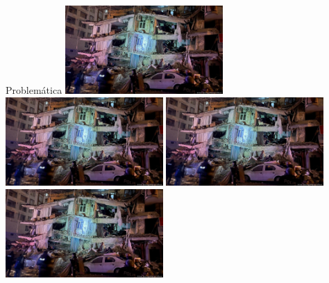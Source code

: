\documentclass[
	12pt, %
	aspectratio=169, %
]{beamer}
\begin{document}
\begin{frame}{Problemática}
  \centering
  \includegraphics[width=0.45\textwidth,height=0.35\textheight]{turquia2}
  \includegraphics[width=0.45\textwidth,height=0.35\textheight]{turquia2}
  \includegraphics[width=0.45\textwidth,height=0.35\textheight]{turquia2}
  \includegraphics[width=0.45\textwidth,height=0.35\textheight]{turquia2}
\end{frame}
\end{document}
